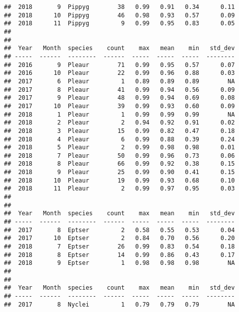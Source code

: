 \documentclass[]{article}
\begin{document}
\begin{verbatim}
##  2018       9  Pippyg        38   0.99   0.91   0.34      0.11
##  2018      10  Pippyg        46   0.98   0.93   0.57      0.09
##  2018      11  Pippyg         9   0.99   0.95   0.83      0.05
## 
## 
##  Year   Month  species    count    max   mean    min   std_dev
## -----  ------  --------  ------  -----  -----  -----  --------
##  2016       9  Pleaur        71   0.99   0.95   0.57      0.07
##  2016      10  Pleaur        22   0.99   0.96   0.88      0.03
##  2017       6  Pleaur         1   0.89   0.89   0.89        NA
##  2017       8  Pleaur        41   0.99   0.94   0.56      0.09
##  2017       9  Pleaur        48   0.99   0.94   0.69      0.08
##  2017      10  Pleaur        39   0.99   0.93   0.60      0.09
##  2018       1  Pleaur         1   0.99   0.99   0.99        NA
##  2018       2  Pleaur         2   0.94   0.92   0.91      0.02
##  2018       3  Pleaur        15   0.99   0.82   0.47      0.18
##  2018       4  Pleaur         6   0.99   0.88   0.39      0.24
##  2018       5  Pleaur         2   0.99   0.98   0.98      0.01
##  2018       7  Pleaur        50   0.99   0.96   0.73      0.06
##  2018       8  Pleaur        66   0.99   0.92   0.38      0.15
##  2018       9  Pleaur        25   0.99   0.90   0.41      0.15
##  2018      10  Pleaur        19   0.99   0.93   0.68      0.10
##  2018      11  Pleaur         2   0.99   0.97   0.95      0.03
## 
## 
##  Year   Month  species    count    max   mean    min   std_dev
## -----  ------  --------  ------  -----  -----  -----  --------
##  2017       8  Eptser         2   0.58   0.55   0.53      0.04
##  2017      10  Eptser         2   0.84   0.70   0.56      0.20
##  2018       7  Eptser        26   0.99   0.83   0.54      0.18
##  2018       8  Eptser        14   0.99   0.86   0.43      0.17
##  2018       9  Eptser         1   0.98   0.98   0.98        NA
## 
## 
##  Year   Month  species    count    max   mean    min   std_dev
## -----  ------  --------  ------  -----  -----  -----  --------
##  2017       8  Nyclei         1   0.79   0.79   0.79        NA
\end{verbatim}
\end{document}
